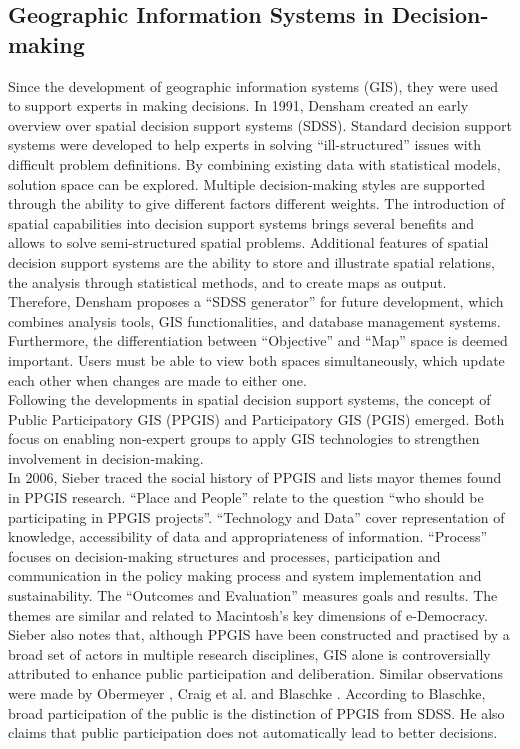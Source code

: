 \subsection{Geographic Information Systems in Decision-making}
\label{subchap:gis_stuff}
Since the development of geographic information systems (GIS), they were used to support experts in making decisions. In 1991, Densham \cite{densham_sdss} created an early overview over spatial decision support systems (SDSS). Standard decision support systems were developed to help experts in solving ``ill-structured'' issues with difficult problem definitions. By combining existing data with statistical models, solution space can be explored. Multiple decision-making styles are supported through the ability to give different factors different weights. The introduction of spatial capabilities into decision support systems brings several benefits and allows to solve semi-structured spatial problems. Additional features of spatial decision support systems are the ability to store and illustrate spatial relations, the analysis through statistical methods, and to create maps as output. Therefore, Densham proposes a ``SDSS generator'' for future development, which combines analysis tools, GIS functionalities, and database management systems. Furthermore, the differentiation between ``Objective'' and ``Map'' space is deemed important. Users must be able to view both spaces simultaneously, which update each other when changes are made to either one.\\
Following the developments in spatial decision support systems, the concept of Public Participatory GIS (PPGIS) and Participatory GIS (PGIS) emerged. Both focus on enabling non-expert groups to apply GIS technologies to strengthen involvement in decision-making.\\
In 2006, Sieber \cite{Sieber2006_PublicParticipationGIS} traced the social history of PPGIS and lists mayor themes found in PPGIS research. ``Place and People'' relate to the question ``who should be participating in PPGIS projects''. ``Technology and Data'' cover representation of knowledge, accessibility of data and appropriateness of information. ``Process'' focuses on decision-making structures and processes, participation and communication in the policy making process and system implementation and sustainability. The ``Outcomes and Evaluation'' measures goals and results. The themes are similar and related to Macintosh's \cite{Macintosh2004_eParticipation_characterization} key dimensions of e-Democracy. Sieber also notes that, although PPGIS have been constructed and practised by a broad set of actors in multiple research disciplines, GIS alone is controversially attributed to enhance public participation and deliberation. Similar observations were made by Obermeyer \cite{obermeyer1998evolution}, Craig et al. \cite{Weiner2002_Participation_and_GIS_eigentlich_Craig} and Blaschke \cite{Blaschke2004_PGIS_critically_revised}. According to Blaschke, broad participation of the public is the distinction of PPGIS from SDSS. He also claims that public participation does not automatically lead to better decisions.\\
